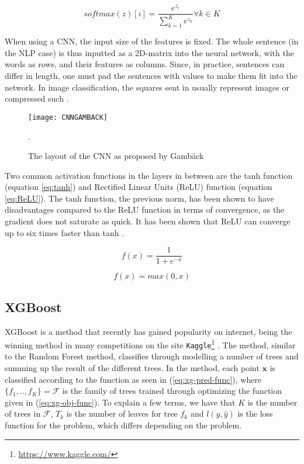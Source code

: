 \documentclass[twocolumn]{article}
\begin{document}
\begin{equation}
\label{eq:softmax}
softmax(z)[i] = \frac{e^{z_i}}{\sum_{k=1}^K e^{z_k}} \forall k \in K
\end{equation}

When using a CNN, the input size of the features is fixed. The whole sentence (in the NLP case) is thus inputted as a 2D-matrix into the neural network, with the words as rows, and their features as columns. Since, in practice, sentences can differ in length, one must pad the sentences with values to make them fit into the network. In image classification, the squares sent in usually represent images or compressed such \cite{2018HateSD}. 

\begin{figure}
  \texttt{[image: CNNGAMBACK]}
  \caption{The layout of the CNN as proposed by Gamb\"ack \cite{Gambck2017}}.
  \label{fig:boat1}
\end{figure} 

Two common activation functions in the layers in between are the tanh function (equation \ref{eq:tanh}) and Rectified Linear Units (ReLU) function (equation \ref{eq:ReLU}). The tanh function, the previous norm, has been shown to have disadvantages compared to the ReLU function in terms of convergence, as the gradient does not saturate as quick. It has been shown that ReLU can converge up to six times faster than tanh \cite{Krizhevsky}.  

\begin{equation}
\label{eq:tanh}
f(x) = \frac{1}{1 + e^{-x}}
\end{equation}

\begin{equation}
\label{eq:ReLU}
f(x) = max(0,x)
\end{equation}

\subsection{XGBoost}

XGBoost is a method that recently has gained popularity on internet, being the winning method in many competitions on the site \verb|Kaggle|\footnote{\url{https://www.kaggle.com/}} \cite{XGBoostChen2016}. The method, similar to the Random Forest method, classifies through modelling a number of trees and summing up the result of the different trees. In the method, each point $\mathbf{x}$ is classified according to the function as seen in (\ref{eq:xg-pred-func}), where $\{f_1, .., f_K\} = \mathcal{F}$ is the family of trees trained through optimizing the function given in (\ref{eq:xg-obj-func}). To explain a few terms, we have that $K$ is the number of trees in $\mathcal{F}$, $T_k$ is the number of leaves for tree $f_k$ and $l(y,\hat{y})$ is the loss function for the problem, which differs depending on the problem. 
\end{document}
